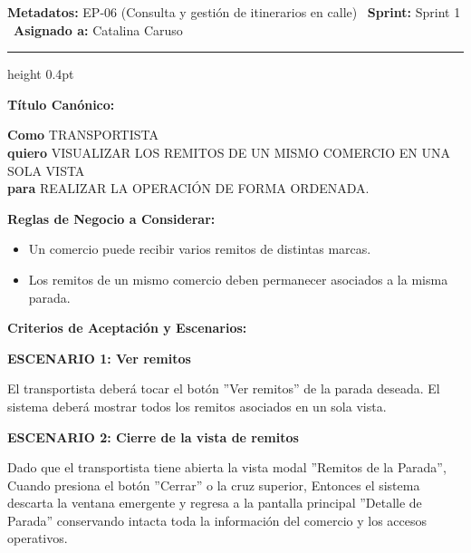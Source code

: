 \documentclass[a4paper,9pt]{article}
\begin{document}
\begin{tcolorbox}[hucard, title={\textbf{HU-25: VISUALIZAR LOS REMITOS AGRUPADOS POR PARADA} \hfill \scriptsize \colorbox{tealstatus}{\textbf{\ Accepted\ }} \quad \colorbox{white}{\textcolor{primarydark}{\textbf{\ 3 pts\ }}}}]
\vspace{-1pt}
\noindent\textbf{\footnotesize Metadatos:} EP-06 (Consulta y gestión de itinerarios en calle) \textbar\ \textbf{Sprint:} Sprint 1 \textbar\ \textbf{Asignado a:} Catalina Caruso\par\vspace{2pt}
\hrule height 0.4pt\par\vspace{3pt}
\noindent\textbf{\footnotesize Título Canónico:}\par\vspace{1pt}
{\small \textbf{Como} TRANSPORTISTA \\ \textbf{quiero} VISUALIZAR LOS REMITOS DE UN MISMO COMERCIO EN UNA SOLA VISTA \\ \textbf{para} REALIZAR LA OPERACIÓN DE FORMA ORDENADA.}\par\vspace{3pt}
\noindent\textbf{\footnotesize Reglas de Negocio a Considerar:}\par\vspace{1pt}
{\footnotesize
\begin{itemize}[leftmargin=12pt, nosep, itemsep=1.5pt, topsep=1pt]
\item Un comercio puede recibir varios remitos de distintas marcas.
\item Los remitos de un mismo comercio deben permanecer asociados a la misma parada.
\end{itemize}
}\par\vspace{3pt}
\noindent\textbf{\footnotesize Criterios de Aceptación y Escenarios:}\par\vspace{2pt}
{\footnotesize
\noindent\textbf{\textcolor{secondarydark}{ESCENARIO 1:  Ver remitos}}\par\vspace{1pt}
El transportista deberá tocar el botón ''Ver remitos'' de la parada deseada. El sistema deberá mostrar todos los remitos asociados en un sola vista.\par\vspace{2.5pt}
\noindent\textbf{\textcolor{secondarydark}{ESCENARIO 2:  Cierre de la vista de remitos}}\par\vspace{1pt}
Dado que el transportista tiene abierta la vista modal ''Remitos de la Parada'', Cuando presiona el botón ''Cerrar'' o la cruz superior, Entonces el sistema descarta la ventana emergente y regresa a la pantalla principal ''Detalle de Parada'' conservando intacta toda la información del comercio y los accesos operativos.\par\vspace{2.5pt}
}\par
\end{tcolorbox}
\end{document}
